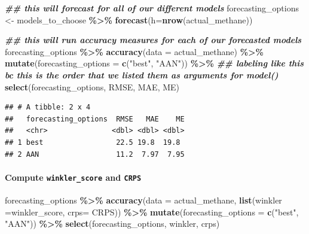\documentclass[
]{article}
\newenvironment{Shaded}{\begin{snugshade}}{\end{snugshade}}
\newcommand{\AttributeTok}[1]{\textcolor[rgb]{0.13,0.29,0.53}{#1}}
\newcommand{\DocumentationTok}[1]{\textcolor[rgb]{0.56,0.35,0.01}{\textbf{\textit{#1}}}}
\newcommand{\FunctionTok}[1]{\textcolor[rgb]{0.13,0.29,0.53}{\textbf{#1}}}
\newcommand{\NormalTok}[1]{#1}
\newcommand{\OtherTok}[1]{\textcolor[rgb]{0.56,0.35,0.01}{#1}}
\newcommand{\SpecialCharTok}[1]{\textcolor[rgb]{0.81,0.36,0.00}{\textbf{#1}}}
\newcommand{\StringTok}[1]{\textcolor[rgb]{0.31,0.60,0.02}{#1}}
\begin{document}
\begin{Shaded}
\begin{Highlighting}[]
\DocumentationTok{\#\# this will forecast for all of our different models}
\NormalTok{forecasting\_options }\OtherTok{\textless{}{-}}\NormalTok{ models\_to\_choose }\SpecialCharTok{\%\textgreater{}\%}
  \FunctionTok{forecast}\NormalTok{(}\AttributeTok{h=}\FunctionTok{nrow}\NormalTok{(actual\_methane))}


\DocumentationTok{\#\# this will run accuracy measures for each of our forecasted models }
\NormalTok{forecasting\_options }\SpecialCharTok{\%\textgreater{}\%}
  \FunctionTok{accuracy}\NormalTok{(}\AttributeTok{data =}\NormalTok{ actual\_methane) }\SpecialCharTok{\%\textgreater{}\%}
  \FunctionTok{mutate}\NormalTok{(}\AttributeTok{forecasting\_options =} \FunctionTok{c}\NormalTok{(}\StringTok{"best"}\NormalTok{, }\StringTok{"AAN"}\NormalTok{)) }\SpecialCharTok{\%\textgreater{}\%} \DocumentationTok{\#\# labeling like this bc this is the order that we listed them as arguments for model()}
  \FunctionTok{select}\NormalTok{(forecasting\_options, RMSE, MAE, ME)}
\end{Highlighting}
\end{Shaded}

\begin{verbatim}
## # A tibble: 2 x 4
##   forecasting_options  RMSE   MAE    ME
##   <chr>               <dbl> <dbl> <dbl>
## 1 best                 22.5 19.8  19.8 
## 2 AAN                  11.2  7.97  7.95
\end{verbatim}

\hypertarget{compute-winkler_score-and-crps}{%
\paragraph{\texorpdfstring{Compute \texttt{winkler\_score} and
\texttt{CRPS}}{Compute winkler\_score and CRPS}}\label{compute-winkler_score-and-crps}}

\begin{Shaded}
\begin{Highlighting}[]
\NormalTok{forecasting\_options }\SpecialCharTok{\%\textgreater{}\%}
  \FunctionTok{accuracy}\NormalTok{(}\AttributeTok{data =}\NormalTok{ actual\_methane, }\FunctionTok{list}\NormalTok{(}\AttributeTok{winkler =}\NormalTok{winkler\_score, }\AttributeTok{crps=}\NormalTok{ CRPS)) }\SpecialCharTok{\%\textgreater{}\%}
  \FunctionTok{mutate}\NormalTok{(}\AttributeTok{forecasting\_options =} \FunctionTok{c}\NormalTok{(}\StringTok{"best"}\NormalTok{, }\StringTok{"AAN"}\NormalTok{)) }\SpecialCharTok{\%\textgreater{}\%} 
  \FunctionTok{select}\NormalTok{(forecasting\_options, winkler, crps)}
\end{Highlighting}
\end{Shaded}
\end{document}

